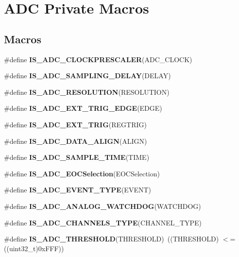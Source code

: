 \hypertarget{group___a_d_c___private___macros}{}\section{A\+DC Private Macros}
\label{group___a_d_c___private___macros}
\subsection*{Macros}
\begin{DoxyCompactItemize}
\item 
\#define {\bfseries I\+S\+\_\+\+A\+D\+C\+\_\+\+C\+L\+O\+C\+K\+P\+R\+E\+S\+C\+A\+L\+ER}(A\+D\+C\+\_\+\+C\+L\+O\+CK)
\item 
\#define {\bfseries I\+S\+\_\+\+A\+D\+C\+\_\+\+S\+A\+M\+P\+L\+I\+N\+G\+\_\+\+D\+E\+L\+AY}(D\+E\+L\+AY)
\item 
\#define {\bfseries I\+S\+\_\+\+A\+D\+C\+\_\+\+R\+E\+S\+O\+L\+U\+T\+I\+ON}(R\+E\+S\+O\+L\+U\+T\+I\+ON)
\item 
\#define {\bfseries I\+S\+\_\+\+A\+D\+C\+\_\+\+E\+X\+T\+\_\+\+T\+R\+I\+G\+\_\+\+E\+D\+GE}(E\+D\+GE)
\item 
\#define {\bfseries I\+S\+\_\+\+A\+D\+C\+\_\+\+E\+X\+T\+\_\+\+T\+R\+IG}(R\+E\+G\+T\+R\+IG)
\item 
\#define {\bfseries I\+S\+\_\+\+A\+D\+C\+\_\+\+D\+A\+T\+A\+\_\+\+A\+L\+I\+GN}(A\+L\+I\+GN)
\item 
\#define {\bfseries I\+S\+\_\+\+A\+D\+C\+\_\+\+S\+A\+M\+P\+L\+E\+\_\+\+T\+I\+ME}(T\+I\+ME)
\item 
\#define {\bfseries I\+S\+\_\+\+A\+D\+C\+\_\+\+E\+O\+C\+Selection}(E\+O\+C\+Selection)
\item 
\#define {\bfseries I\+S\+\_\+\+A\+D\+C\+\_\+\+E\+V\+E\+N\+T\+\_\+\+T\+Y\+PE}(E\+V\+E\+NT)
\item 
\#define {\bfseries I\+S\+\_\+\+A\+D\+C\+\_\+\+A\+N\+A\+L\+O\+G\+\_\+\+W\+A\+T\+C\+H\+D\+OG}(W\+A\+T\+C\+H\+D\+OG)
\item 
\#define {\bfseries I\+S\+\_\+\+A\+D\+C\+\_\+\+C\+H\+A\+N\+N\+E\+L\+S\+\_\+\+T\+Y\+PE}(C\+H\+A\+N\+N\+E\+L\+\_\+\+T\+Y\+PE)
\item 
\#define {\bfseries I\+S\+\_\+\+A\+D\+C\+\_\+\+T\+H\+R\+E\+S\+H\+O\+LD}(T\+H\+R\+E\+S\+H\+O\+LD)~((T\+H\+R\+E\+S\+H\+O\+LD) $<$= ((uint32\+\_\+t)0x\+F\+F\+F))\hypertarget{group___a_d_c___private___macros_gaa71cdff6dafddfccff8a7e88768bfb54}{}\label{group___a_d_c___private___macros_gaa71cdff6dafddfccff8a7e88768bfb54}


\end{DoxyCompactItemize}
